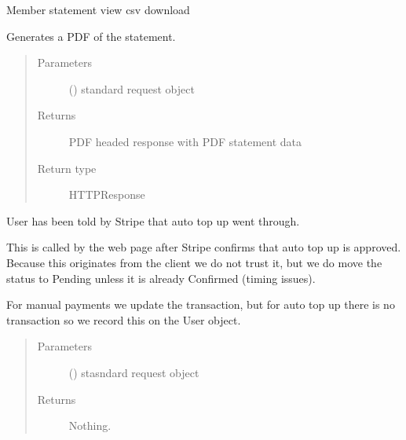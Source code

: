 \documentclass[letterpaper,10pt,english]{sphinxmanual}
\begin{document}
\begin{fulllineitems}
\label{\detokenize{payments:payments.views.statement_pdf}}
Member statement view \sphinxhyphen{} csv download

Generates a PDF of the statement.
\begin{quote}\begin{description}
\item[{Parameters}] \leavevmode
{} () \textendash{} standard request object

\item[{Returns}] \leavevmode
PDF headed response with PDF statement data

\item[{Return type}] \leavevmode
HTTPResponse

\end{description}\end{quote}

\end{fulllineitems}


\begin{fulllineitems}
\label{\detokenize{payments:payments.views.stripe_autotopup_confirm}}
User has been told by Stripe that auto top up went through.

This is called by the web page after Stripe confirms that auto top up is approved.
Because this originates from the client we do not trust it, but we do move
the status to Pending unless it is already Confirmed (timing issues).

For manual payments we update the transaction, but for auto top up there is
no transaction so we record this on the User object.
\begin{quote}\begin{description}
\item[{Parameters}] \leavevmode
{} () \textendash{} stasndard request object

\item[{Returns}] \leavevmode
Nothing.

\end{description}\end{quote}

\end{fulllineitems}
\end{document}
